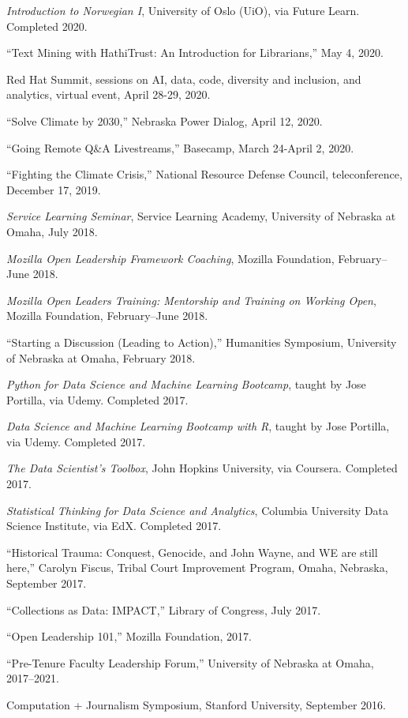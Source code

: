 \emph{Introduction to Norwegian I}, University of Oslo (UiO), via Future
Learn. Completed 2020.

``Text Mining with HathiTrust: An Introduction for Librarians,'' May 4,
2020.

Red Hat Summit, sessions on AI, data, code, diversity and inclusion, and
analytics, virtual event, April 28-29, 2020.

``Solve Climate by 2030,'' Nebraska Power Dialog, April 12, 2020.

``Going Remote Q\&A Livestreams,'' Basecamp, March 24-April 2, 2020.

``Fighting the Climate Crisis,'' National Resource Defense Council,
teleconference, December 17, 2019.

\emph{Service Learning Seminar}, Service Learning Academy, University of
Nebraska at Omaha, July 2018.

\emph{Mozilla Open Leadership Framework Coaching}, Mozilla Foundation,
February--June 2018.

\emph{Mozilla Open Leaders Training: Mentorship and Training on Working
Open}, Mozilla Foundation, February--June 2018.

``Starting a Discussion (Leading to Action),'' Humanities Symposium,
University of Nebraska at Omaha, February 2018.

\emph{Python for Data Science and Machine Learning Bootcamp}, taught by
Jose Portilla, via Udemy. Completed 2017.

\emph{Data Science and Machine Learning Bootcamp with R}, taught by Jose
Portilla, via Udemy. Completed 2017.

\emph{The Data Scientist's Toolbox}, John Hopkins University, via
Coursera. Completed 2017.

\emph{Statistical Thinking for Data Science and Analytics}, Columbia
University Data Science Institute, via EdX. Completed 2017.

``Historical Trauma: Conquest, Genocide, and John Wayne, and WE are
still here,'' Carolyn Fiscus, Tribal Court Improvement Program, Omaha,
Nebraska, September 2017.

``Collections as Data: IMPACT,'' Library of Congress, July 2017.

``Open Leadership 101,'' Mozilla Foundation, 2017.

``Pre-Tenure Faculty Leadership Forum,'' University of Nebraska at
Omaha, 2017--2021.

Computation + Journalism Symposium, Stanford University, September 2016.

